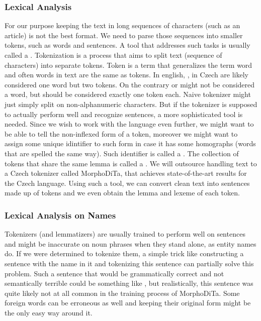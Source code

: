 \subsubsection{Lexical Analysis}
For our purpose keeping the text in long sequences of characters (such as an article) is not the best format. We need to parse those sequences into smaller tokens, such as words and sentences. A tool that addresses such tasks is usually called a .
Tokenization is a process that aims to split text (sequence of characters) into separate tokens. Token is a term that generalizes the term word and often words in text are the same as tokens. In english, , in Czech  are likely considered one word but two tokens. On the contrary  or  might not be considered a word, but should be considered exactly one token each. Naive tokenizer might just simply split on non-alphanumeric characters. But if the tokenizer is supposed to actually perform well and recognize sentences, a more sophisticated tool is needed. 
Since we wish to work with the language even further, we might want to be able to tell the non-inflexed form of a token, moreover we might want to assign some unique idintifier to such form in case it has some homographs (words that are spelled the same way). Such identifier is called a . The collection of tokens that share the same lemma is called a . 
We will outsource handling text to a Czech tokenizer called MorphoDiTa, that achieves state-of-the-art results for the Czech language. Using such a tool, we can convert clean text into sentences made up of tokens and we even obtain the lemma and lexeme of each token.

\subsubsection{Lexical Analysis on Names}
Tokenizers (and lemmatizers) are usually trained to perform well on sentences and might be inaccurate on noun phrases when they stand alone, as entity names do. If we were determined to tokenize them, a simple trick like constructing a sentence with the name in it and tokenizing this sentence can partially solve this problem. Such a sentence that would be grammatically correct and not semantically terrible could be something like  , but realistically, this sentence was quite likely not at all common in the training process of MorphoDiTa. Some foreign words can be erroneous as well and keeping their original form might be the only easy way around it.

